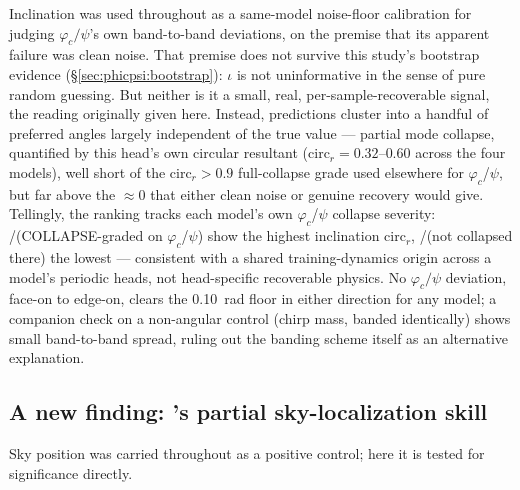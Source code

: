 Inclination was used throughout as a same-model noise-floor calibration for judging $\varphi_c/\psi$'s own band-to-band deviations, on the premise that its apparent failure was clean noise.
That premise does not survive this study's bootstrap evidence (\S\ref{sec:phicpsi:bootstrap}): $\iota$ is not uninformative in the sense of pure random guessing.
But neither is it a small, real, per-sample-recoverable signal, the reading originally given here.
Instead, predictions cluster into a handful of preferred angles largely independent of the true value --- partial mode collapse, quantified by this head's own circular resultant ($\text{circ}_r=0.32$--$0.60$ across the four models), well short of the $\text{circ}_r>0.9$ full-collapse grade used elsewhere for $\varphi_c$/$\psi$, but far above the $\approx0$ that either clean noise or genuine recovery would give.
Tellingly, the ranking tracks each model's own $\varphi_c$/$\psi$ collapse severity: \pocA/\pocB (COLLAPSE-graded on $\varphi_c$/$\psi$) show the highest inclination $\text{circ}_r$, \Tcn/\cnnAttn (not collapsed there) the lowest --- consistent with a shared training-dynamics origin across a model's periodic heads, not head-specific recoverable physics.
No $\varphi_c/\psi$ deviation, face-on to edge-on, clears the 0.10~rad floor in either direction for any model; a companion check on a non-angular control (chirp mass, banded identically) shows small band-to-band spread, ruling out the banding scheme itself as an alternative explanation.

\subsection{A new finding: \cnnAttn's partial sky-localization skill}
\label{sec:phicpsi:sky}

Sky position was carried throughout as a positive control; here it is tested for significance directly.

